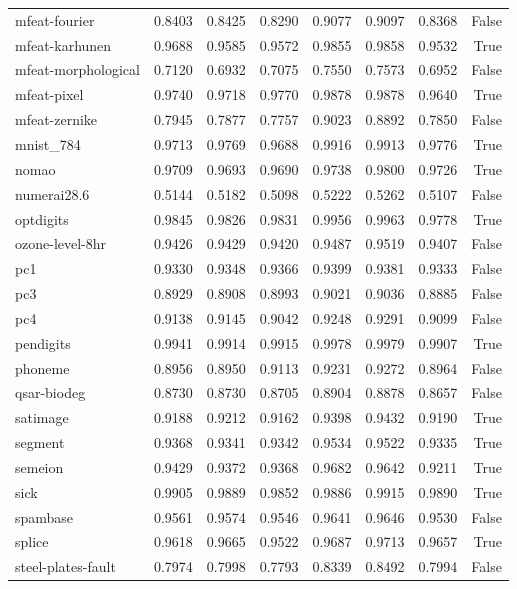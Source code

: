 \begin{table}[htbp]
\begin{tabular}{lrrrrrrr}
mfeat-fourier & 0.8403 & 0.8425 & 0.8290 & 0.9077 & 0.9097 & 0.8368 & False \\
mfeat-karhunen & 0.9688 & 0.9585 & 0.9572 & 0.9855 & 0.9858 & 0.9532 & True \\
mfeat-morphological & 0.7120 & 0.6932 & 0.7075 & 0.7550 & 0.7573 & 0.6952 & False \\
mfeat-pixel & 0.9740 & 0.9718 & 0.9770 & 0.9878 & 0.9878 & 0.9640 & True \\
mfeat-zernike & 0.7945 & 0.7877 & 0.7757 & 0.9023 & 0.8892 & 0.7850 & False \\
mnist\_784 & 0.9713 & 0.9769 & 0.9688 & 0.9916 & 0.9913 & 0.9776 & True \\
nomao & 0.9709 & 0.9693 & 0.9690 & 0.9738 & 0.9800 & 0.9726 & True \\
numerai28.6 & 0.5144 & 0.5182 & 0.5098 & 0.5222 & 0.5262 & 0.5107 & False \\
optdigits & 0.9845 & 0.9826 & 0.9831 & 0.9956 & 0.9963 & 0.9778 & True \\
ozone-level-8hr & 0.9426 & 0.9429 & 0.9420 & 0.9487 & 0.9519 & 0.9407 & False \\
pc1 & 0.9330 & 0.9348 & 0.9366 & 0.9399 & 0.9381 & 0.9333 & False \\
pc3 & 0.8929 & 0.8908 & 0.8993 & 0.9021 & 0.9036 & 0.8885 & False \\
pc4 & 0.9138 & 0.9145 & 0.9042 & 0.9248 & 0.9291 & 0.9099 & False \\
pendigits & 0.9941 & 0.9914 & 0.9915 & 0.9978 & 0.9979 & 0.9907 & True \\
phoneme & 0.8956 & 0.8950 & 0.9113 & 0.9231 & 0.9272 & 0.8964 & False \\
qsar-biodeg & 0.8730 & 0.8730 & 0.8705 & 0.8904 & 0.8878 & 0.8657 & False \\
satimage & 0.9188 & 0.9212 & 0.9162 & 0.9398 & 0.9432 & 0.9190 & True \\
segment & 0.9368 & 0.9341 & 0.9342 & 0.9534 & 0.9522 & 0.9335 & True \\
semeion & 0.9429 & 0.9372 & 0.9368 & 0.9682 & 0.9642 & 0.9211 & True \\
sick & 0.9905 & 0.9889 & 0.9852 & 0.9886 & 0.9915 & 0.9890 & True \\
spambase & 0.9561 & 0.9574 & 0.9546 & 0.9641 & 0.9646 & 0.9530 & False \\
splice & 0.9618 & 0.9665 & 0.9522 & 0.9687 & 0.9713 & 0.9657 & True \\
steel-plates-fault & 0.7974 & 0.7998 & 0.7793 & 0.8339 & 0.8492 & 0.7994 & False \\

\end{tabular}
\end{table}
